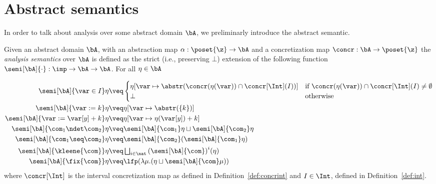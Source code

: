 \section{Abstract semantics}\label{sec:abstractsem}

In order to talk about analysis over some abstract domain \(\bA\), we
preliminarly introduce the abstract semantic.

\begin{definition}\label{def:abstrsem}
  Given an abstract domain \(\bA\), with an abstraction map
  \({\alpha : \poset{\z} \to \bA}\) and a concretization map
  \({\concr : \bA \to \poset{\z}}\) the \emph{analysis semantics} over
  \(\bA\) is defined as the strict (i.e., preserving \(\bot\))
  extension of the following function
  \({\semi[\bA]{\cdot} : \imp \to \bA \to \bA}\). For all
  \(\eta \in \bA\)

  \begin{align*}
    \semi[\bA]{\var \in I}\eta 
    & \veq  
      \begin{cases}
        \eta[\var \mapsto \abstr(\concr(\eta(\var)) \cap \concr[\Int](I))] & \text{if }\concr(\eta(\var)) \cap \concr[\Int](I) \neq \emptyset \\
        \bot & \text{otherwise}
      \end{cases}\\
    \semi[\bA]{\var := k}\eta 
    & \veq \eta[\var \mapsto \abstr(\{k\})]\\
    \semi[\bA]{\var := \var[y] + k}\eta 
    & \veq \eta[\var \mapsto \eta (\var[y]) + k]\\
    \semi[\bA]{\com_1 \ndet \com_2} \eta
    & \veq \semi[\bA]{\com_1} \eta \sqcup \semi[\bA]{\com_2} \eta\\
    \semi[\bA]{\com_1 \seq \com_2} \eta
    & \veq \semi[\bA]{\com_2} (\semi[\bA]{\com_1} \eta)\\
    \semi[\bA]{\kleene{\com}} \eta
    & \veq \textstyle \bigsqcup_{i \in \nat} {\left(\semi[\bA]{\com}\right)}^i (\eta)\\
    \semi[\bA]{\fix{\com}} \eta
    & \veq  \lfp(\lambda \mu. (\eta \sqcup \semi[\bA]{\com} \mu))
  \end{align*}
  where \(\concr[\Int]\) is the interval concretization map as defined
  in Definition~\ref{def:concrint} and \(I \in \Int\), defined in
  Definition~\ref{def:int}.
\end{definition}

